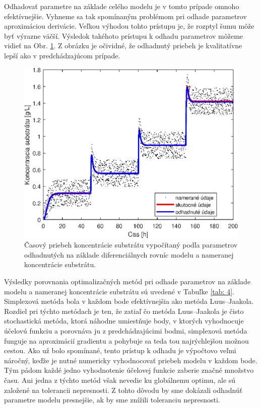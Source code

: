 Odhadovať parametre na základe celého modelu je v tomto prípade omnoho efektívnejšie. Vyhneme sa tak spomínaným problémom pri odhade parametrov aproximáciou derivácie. Veľkou výhodou tohto prístupu je, že rozptyl šumu môže byť výrazne väčší. Výsledok takéhoto prístupu k odhadu parametrov môžeme vidieť na Obr. \ref{fig:9}. Z obrázku je očividné, že odhadnutý priebeh je kvalitatívne lepší ako v predchádzajúcom prípade.

\begin{figure}
	\centering
	\includegraphics[width=.7\linewidth]{images/param_approx_diff_eq}
	\caption[]{Časový priebeh koncentrácie substrátu vypočítaný podľa parametrov odhadnutých na základe diferenciálnych rovníc modelu a nameranej koncentrácie substrátu.}
	\label{fig:9}
\end{figure}

Výsledky porovnania optimalizačných metód pri odhade parametrov na základe modelu a nameranej koncentrácie substrátu sú uvedené v Tabuľke \ref{tab: 4}. Simplexová metóda bola v každom bode efektívnejšia ako metóda Luus--Jaakola. Rozdiel pri týchto metódach je ten, že zatiaľ čo metóda Luus--Jaakola je čisto stochastická metóda, ktorá náhodne umiestňuje body, v ktorých vyhodnocuje účelovú funkciu a porovnáva ju z predchádzajúcimi bodmi, simplexová metóda funguje na aproximácií gradientu a pohybuje sa teda tou najrýchlejšou možnou cestou.
Ako už bolo spomínané, tento prístup k odhadu je výpočtovo veľmi náročný, keďže je nutné numericky vyhodnocovať priebeh modelu v každom bode. Tým pádom každé jedno vyhodnotenie účelovej funkcie zaberie značné množstvo času. Ani jedna z týchto metód však nevedie ku globálnemu optimu, ale sú založené na tolerancii nepresnosti.
Z tohto dôvodu by sme dokázali odhadnúť parametre modelu presnejšie, ak by sme znížili toleranciu nepresnosti.

